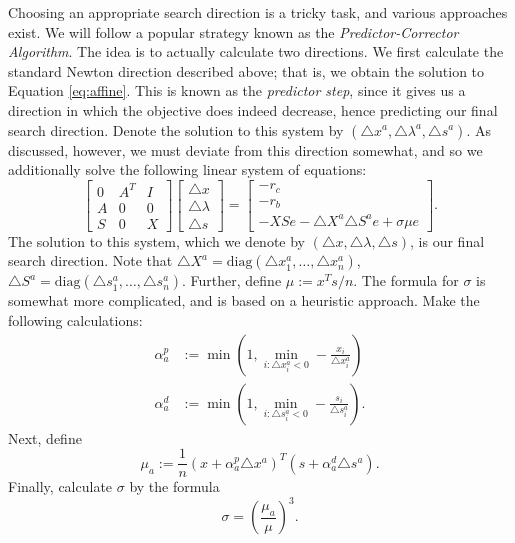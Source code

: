 Choosing an appropriate search direction is a tricky task, and various approaches exist. We will follow a popular strategy
known as the \emph{Predictor-Corrector Algorithm}. The idea is to actually calculate two directions. We first calculate
the standard Newton direction described above; that is, we obtain the solution to Equation \ref{eq:affine}. This is known as
the \emph{predictor step}, since it gives us a direction in which the objective does indeed decrease, hence predicting our
final search direction. Denote the solution to this system by $(\triangle x^a, \triangle \lambda^a, \triangle s^a)$.
As discussed, however, we must deviate from this direction somewhat, and so we additionally solve the
following linear system of equations:
\begin{equation}
\begin{bmatrix}
0 & A^T & I\\
A & 0 & 0\\
S & 0 & X
\end{bmatrix}
\begin{bmatrix}
\triangle x\\
\triangle \lambda\\
\triangle s
\end{bmatrix}
=
\begin{bmatrix}
-r_c\\
-r_b\\
-XSe - \triangle X^a\triangle S^ae + \sigma \mu e
\end{bmatrix}.
\label{eq:centering}
\end{equation}
The solution to this system, which we denote by $(\triangle x, \triangle \lambda, \triangle s)$, is our final search direction.
Note that $\triangle X^a = \text{diag}(\triangle x_1^a,\ldots,\triangle x_n^a)$, $\triangle S^a = \text{diag}(\triangle s_1^a,\ldots,\triangle s_n^a)$. Further, define $\mu := x^Ts/n$. The formula for $\sigma$ is somewhat more complicated, and
is based on a heuristic approach. Make the following calculations:
\begin{align*}
\alpha_a^p &:= \min\left(1, \displaystyle\min_{i : \triangle x_i^a < 0}-\frac{x_i}{\triangle x_i^a}\right)\\
\alpha_a^d &:= \min\left(1, \displaystyle\min_{i : \triangle s_i^a < 0}-\frac{s_i}{\triangle s_i^a}\right).
\end{align*}
Next, define
$$
\mu_a := \frac{1}{n}(x+\alpha_a^p\triangle x^a)^T(s+\alpha_a^d\triangle s^a).
$$
Finally, calculate $\sigma$ by the formula
$$
\sigma = \left(\frac{\mu_a}{\mu}\right)^3.
$$


